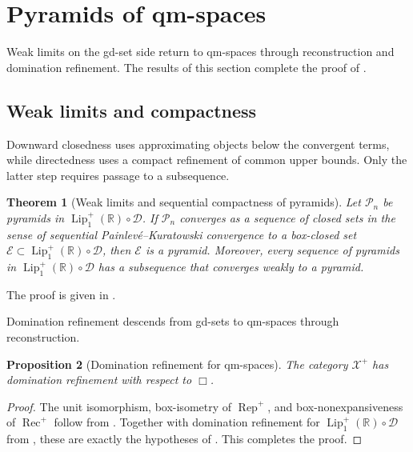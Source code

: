 \documentclass{amsart}
\theoremstyle{plain}
\newtheorem{theorem}{Theorem}[section]
\newtheorem{proposition}[theorem]{Proposition}
\theoremstyle{definition}
\theoremstyle{remark}
\newcommand{\R}{\mathbb{R}}
\newcommand{\D}{\mathcal{D}}
\newcommand{\Xp}{\mathcal{X}^{+}}
\newcommand{\Lup}{\operatorname{Lip}^{+}_{1}(\R)}
\begin{document}
\section{Pyramids of qm-spaces}

Weak limits on the gd-set side return to qm-spaces through reconstruction and domination refinement. The results of this section complete the proof of .

\subsection{Weak limits and compactness}

Downward closedness uses approximating objects below the convergent terms, while directedness uses a compact refinement of common upper bounds. Only the latter step requires passage to a subsequence.

\begin{theorem}[Weak limits and sequential compactness of pyramids]
\label{thm:gds-pyramid-weak-limit-and-sequential-compactness}
Let $\mathcal P_n$ be pyramids in $\Lup\circ\D$. If $\mathcal P_n$ converges as a sequence of closed sets in the sense of sequential Painlev\'e--Kuratowski convergence to a box-closed set $\mathcal E\subset\Lup\circ\D$, then $\mathcal E$ is a pyramid. Moreover, every sequence of pyramids in $\Lup\circ\D$ has a subsequence that converges weakly to a pyramid.
\end{theorem}

The proof is given in .

Domination refinement descends from gd-sets to qm-spaces through reconstruction.

\begin{proposition}[Domination refinement for qm-spaces]
\label{prop:asymmetric-domination-refinement}
The category $\Xp$ has domination refinement with respect to $\Box$.
\end{proposition}

\begin{proof}
The unit isomorphism, box-isometry of $\operatorname{Rep}^{+}$, and box-nonexpansiveness of $\operatorname{Rec}^{+}$ follow from . Together with domination refinement for $\Lup\circ\D$ from \cite[Lemma~5.4]{gds2}, these are exactly the hypotheses of .
This completes the proof.
\end{proof}
\end{document}
